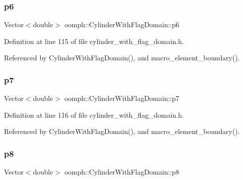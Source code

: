 \subsubsection{\texorpdfstring{p6}{p6}}
{\footnotesize\ttfamily Vector$<$double$>$ oomph\+::\+Cylinder\+With\+Flag\+Domain\+::p6\hspace{0.3cm}{\ttfamily [private]}}



Definition at line 115 of file cylinder\+\_\+with\+\_\+flag\+\_\+domain.\+h.



Referenced by Cylinder\+With\+Flag\+Domain(), and macro\+\_\+element\+\_\+boundary().

\mbox{\label{classoomph_1_1CylinderWithFlagDomain_ae0aaa23dad312e7ea308e98b59015a51}} 
\subsubsection{\texorpdfstring{p7}{p7}}
{\footnotesize\ttfamily Vector$<$double$>$ oomph\+::\+Cylinder\+With\+Flag\+Domain\+::p7\hspace{0.3cm}{\ttfamily [private]}}



Definition at line 116 of file cylinder\+\_\+with\+\_\+flag\+\_\+domain.\+h.



Referenced by Cylinder\+With\+Flag\+Domain(), and macro\+\_\+element\+\_\+boundary().

\mbox{\label{classoomph_1_1CylinderWithFlagDomain_a20743a18902498e2537f557da2fec123}} 
\subsubsection{\texorpdfstring{p8}{p8}}
{\footnotesize\ttfamily Vector$<$double$>$ oomph\+::\+Cylinder\+With\+Flag\+Domain\+::p8\hspace{0.3cm}{\ttfamily [private]}}



